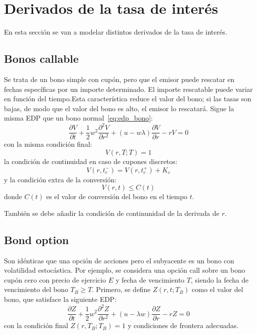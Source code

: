 \section{Derivados de la tasa de interés}

En esta sección se van a modelar distintos derivados de la tasa de interés.


\subsection{Bonos callable}
Se trata de un bono simple con cupón, pero que el emisor puede rescatar en fechas específicas por un importe determinado. El importe rescatable puede variar en función del tiempo.Esta característica reduce el valor del bono; si las tasas son bajas, de modo que el valor del bono es alto, el emisor lo rescatará.
Sigue la misma EDP que un bono normal~\eqref{eq:edp_bono}:
\begin{equation*}
    \boxed{\frac{\partial V}{\partial t} + \frac{1}{2} w^2 \frac{\partial^2 V}{\partial r^2} + (u - w\lambda) \frac{\partial V}{\partial r} - rV = 0}
\end{equation*}
con la misma condición final:
\begin{equation*}
    \boxed{V(r,T;T) = 1}
\end{equation*}
la condición de continuidad en caso de cupones discretos:
\begin{equation*}
    \boxed{V(r, t_c^-) = V(r, t_c^+) + K_c}
\end{equation*}
y la condición extra de la conversión:
\begin{equation*}
    \boxed{V(r,t) \leq C(t)}
\end{equation*}
donde $C(t)$ es el valor de conversión del bono en el tiempo $t$.

También se debe añadir la condición de continunidad de la derivada de $r$.





\subsection{Bond option}
Son idénticas que una opción de acciones pero el subyacente es un bono con volatilidad estocástica. Por ejemplo, se considera una opción call sobre un bono cupón cero con precio de ejercicio $E$ y fecha de vencimiento $T$, siendo la fecha de vencimiento del bono $T_B \geq T$. Primero, se define $Z(r, t; T_B)$ como el valor del bono, que satisface la siguiente EDP:
\begin{equation*}
    \frac{\partial Z}{\partial t} + \frac{1}{2} w^2 \frac{\partial^2 Z}{\partial r^2} + (u - \lambda w) \frac{\partial Z}{\partial r} - rZ = 0
\end{equation*}
con la condición final $Z(r, T_B; T_B) = 1$ y condiciones de frontera adecuadas.

